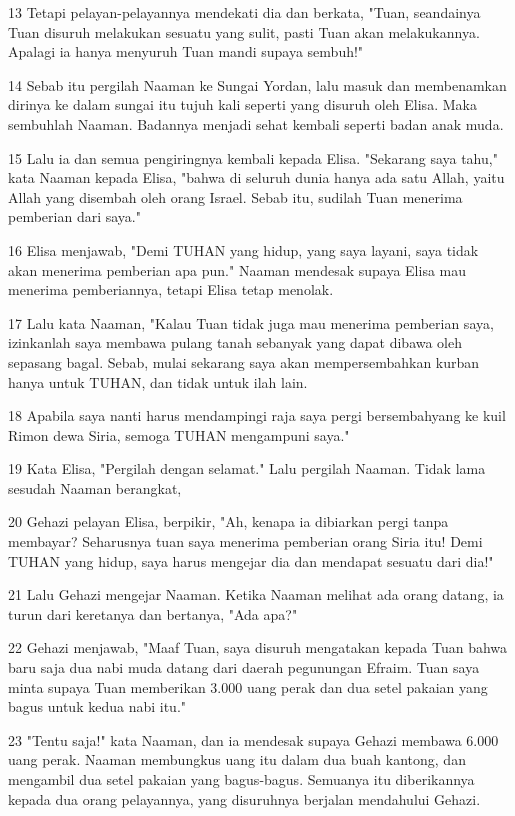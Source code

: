 \par 13 Tetapi pelayan-pelayannya mendekati dia dan berkata, "Tuan, seandainya Tuan disuruh melakukan sesuatu yang sulit, pasti Tuan akan melakukannya. Apalagi ia hanya menyuruh Tuan mandi supaya sembuh!"
\par 14 Sebab itu pergilah Naaman ke Sungai Yordan, lalu masuk dan membenamkan dirinya ke dalam sungai itu tujuh kali seperti yang disuruh oleh Elisa. Maka sembuhlah Naaman. Badannya menjadi sehat kembali seperti badan anak muda.
\par 15 Lalu ia dan semua pengiringnya kembali kepada Elisa. "Sekarang saya tahu," kata Naaman kepada Elisa, "bahwa di seluruh dunia hanya ada satu Allah, yaitu Allah yang disembah oleh orang Israel. Sebab itu, sudilah Tuan menerima pemberian dari saya."
\par 16 Elisa menjawab, "Demi TUHAN yang hidup, yang saya layani, saya tidak akan menerima pemberian apa pun." Naaman mendesak supaya Elisa mau menerima pemberiannya, tetapi Elisa tetap menolak.
\par 17 Lalu kata Naaman, "Kalau Tuan tidak juga mau menerima pemberian saya, izinkanlah saya membawa pulang tanah sebanyak yang dapat dibawa oleh sepasang bagal. Sebab, mulai sekarang saya akan mempersembahkan kurban hanya untuk TUHAN, dan tidak untuk ilah lain.
\par 18 Apabila saya nanti harus mendampingi raja saya pergi bersembahyang ke kuil Rimon dewa Siria, semoga TUHAN mengampuni saya."
\par 19 Kata Elisa, "Pergilah dengan selamat." Lalu pergilah Naaman. Tidak lama sesudah Naaman berangkat,
\par 20 Gehazi pelayan Elisa, berpikir, "Ah, kenapa ia dibiarkan pergi tanpa membayar? Seharusnya tuan saya menerima pemberian orang Siria itu! Demi TUHAN yang hidup, saya harus mengejar dia dan mendapat sesuatu dari dia!"
\par 21 Lalu Gehazi mengejar Naaman. Ketika Naaman melihat ada orang datang, ia turun dari keretanya dan bertanya, "Ada apa?"
\par 22 Gehazi menjawab, "Maaf Tuan, saya disuruh mengatakan kepada Tuan bahwa baru saja dua nabi muda datang dari daerah pegunungan Efraim. Tuan saya minta supaya Tuan memberikan 3.000 uang perak dan dua setel pakaian yang bagus untuk kedua nabi itu."
\par 23 "Tentu saja!" kata Naaman, dan ia mendesak supaya Gehazi membawa 6.000 uang perak. Naaman membungkus uang itu dalam dua buah kantong, dan mengambil dua setel pakaian yang bagus-bagus. Semuanya itu diberikannya kepada dua orang pelayannya, yang disuruhnya berjalan mendahului Gehazi.
